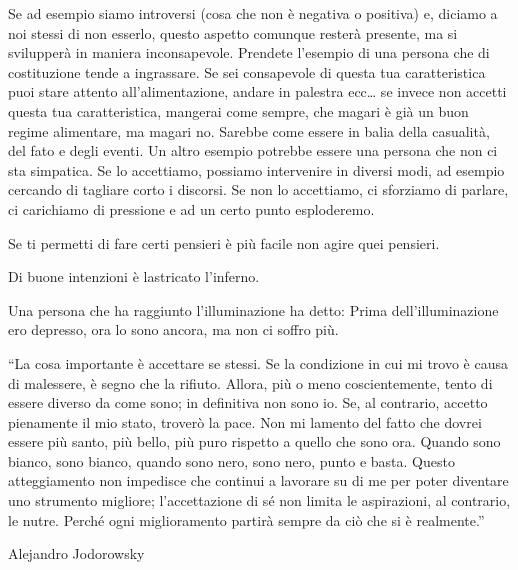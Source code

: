 \documentclass[12pt]{book} %
\begin{document}
Se ad esempio siamo introversi (cosa che non è negativa o positiva) e, diciamo a noi stessi di non esserlo, questo
aspetto comunque resterà presente, ma si svilupperà in maniera inconsapevole. Prendete l'esempio
di una persona che di costituzione tende a ingrassare. Se sei consapevole di questa tua caratteristica puoi stare
attento all'alimentazione, andare in palestra ecc… se invece non accetti questa tua
caratteristica, mangerai come sempre, che magari è già un buon regime alimentare, ma magari no. Sarebbe come essere in
balia della casualità, del fato e degli eventi. Un altro esempio potrebbe essere una persona che non ci sta simpatica.
Se lo accettiamo, possiamo intervenire in diversi modi, ad esempio cercando di tagliare corto i discorsi. Se non lo
accettiamo, ci sforziamo di parlare, ci carichiamo di pressione e ad un certo punto esploderemo.

Se ti permetti di fare certi pensieri è più facile non agire quei pensieri.

Di buone intenzioni è lastricato l'inferno.

Una persona che ha raggiunto l'illuminazione ha detto: Prima dell'illuminazione ero depresso, ora
lo sono ancora, ma non ci soffro più. 

“La cosa importante è accettare se stessi. Se la condizione in cui mi trovo è causa di malessere, è segno che la
rifiuto. Allora, più o meno coscientemente, tento di essere diverso da come sono; in definitiva non sono io. Se, al
contrario, accetto pienamente il mio stato, troverò la pace. Non mi lamento del fatto che dovrei essere più santo, più
bello, più puro rispetto a quello che sono ora. Quando sono bianco, sono bianco, quando sono nero, sono nero, punto e
basta. Questo atteggiamento non impedisce che continui a lavorare su di me per poter diventare uno strumento migliore;
l'accettazione di sé non limita le aspirazioni, al contrario, le nutre. Perché ogni miglioramento
partirà sempre da ciò che si è realmente.” 

Alejandro Jodorowsky


\bigskip


\bigskip


\bigskip


\bigskip
\end{document}
